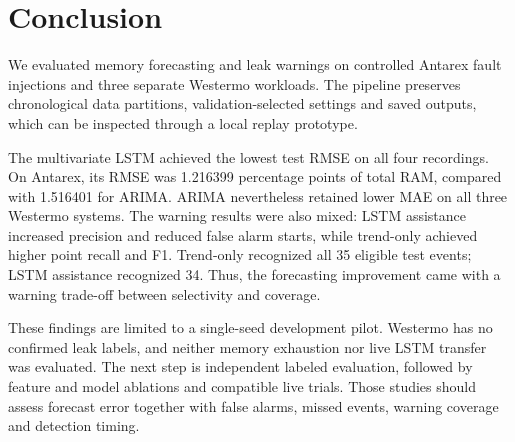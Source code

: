 \documentclass[10pt,a4paper,twocolumn]{article}
\begin{document}
\section{Conclusion}

We evaluated memory forecasting and leak warnings on controlled Antarex fault injections and three separate Westermo workloads. The pipeline preserves chronological data partitions, validation-selected settings and saved outputs, which can be inspected through a local replay prototype.

The multivariate LSTM achieved the lowest test RMSE on all four recordings. On Antarex, its RMSE was 1.216399 percentage points of total RAM, compared with 1.516401 for ARIMA. ARIMA nevertheless retained lower MAE on all three Westermo systems. The warning results were also mixed: LSTM assistance increased precision and reduced false alarm starts, while trend-only achieved higher point recall and F1. Trend-only recognized all 35 eligible test events; LSTM assistance recognized 34. Thus, the forecasting improvement came with a warning trade-off between selectivity and coverage.

These findings are limited to a single-seed development pilot. Westermo has no confirmed leak labels, and neither memory exhaustion nor live LSTM transfer was evaluated. The next step is independent labeled evaluation, followed by feature and model ablations and compatible live trials. Those studies should assess forecast error together with false alarms, missed events, warning coverage and detection timing.
\end{document}
